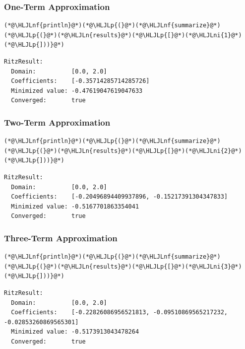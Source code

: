 \documentclass[12pt,a4paper]{article}
\newcommand{\HLJLn}[1]{#1}
\newcommand{\HLJLnf}[1]{\textcolor[RGB]{66,102,213}{#1}}
\newcommand{\HLJLni}[1]{\textcolor[RGB]{59,151,46}{#1}}
\newcommand{\HLJLp}[1]{#1}
\begin{document}
\subsubsection{One-Term Approximation}

\begin{lstlisting}
(*@\HLJLnf{println}@*)(*@\HLJLp{(}@*)(*@\HLJLnf{summarize}@*)(*@\HLJLp{(}@*)(*@\HLJLn{results}@*)(*@\HLJLp{[}@*)(*@\HLJLni{1}@*)(*@\HLJLp{]))}@*)
\end{lstlisting}

\begin{lstlisting}
RitzResult:
  Domain:          [0.0, 2.0]
  Coefficients:    [-0.35714285714285726]
  Minimized value: -0.47619047619047633
  Converged:       true
\end{lstlisting}


\subsubsection{Two-Term Approximation}

\begin{lstlisting}
(*@\HLJLnf{println}@*)(*@\HLJLp{(}@*)(*@\HLJLnf{summarize}@*)(*@\HLJLp{(}@*)(*@\HLJLn{results}@*)(*@\HLJLp{[}@*)(*@\HLJLni{2}@*)(*@\HLJLp{]))}@*)
\end{lstlisting}

\begin{lstlisting}
RitzResult:
  Domain:          [0.0, 2.0]
  Coefficients:    [-0.20496894409937896, -0.15217391304347833]
  Minimized value: -0.5167701863354041
  Converged:       true
\end{lstlisting}


\subsubsection{Three-Term Approximation}

\begin{lstlisting}
(*@\HLJLnf{println}@*)(*@\HLJLp{(}@*)(*@\HLJLnf{summarize}@*)(*@\HLJLp{(}@*)(*@\HLJLn{results}@*)(*@\HLJLp{[}@*)(*@\HLJLni{3}@*)(*@\HLJLp{]))}@*)
\end{lstlisting}

\begin{lstlisting}
RitzResult:
  Domain:          [0.0, 2.0]
  Coefficients:    [-0.22826086956521813, -0.09510869565217232, -0.02853260869565301]
  Minimized value: -0.5173913043478264
  Converged:       true
\end{lstlisting}
\end{document}
